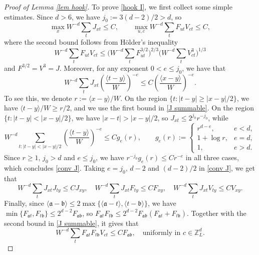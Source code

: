 \documentclass{article}
\newcommand{\1}{\mathds{1}}
\numberwithin{equation}{section}
\newcommand{\be}{\begin{equation}}
\newcommand{\ee}{\end{equation}}
\newcommand{\fa}{{\mathfrak a}}
\newcommand{\fb}{{\mathfrak b}}
\renewcommand{\leq}{\leqslant}
\renewcommand{\geq}{\geqslant}
\renewcommand{\le}{\leq}
\renewcommand{\ge}{\geq}
\newcommand{\Z}{\mathbb{Z}}
\theoremstyle{plain} %
\theoremstyle{remark}
\begin{document}
\begin{proof}[Proof of Lemma \ref{lem hook}]
To prove \eqref{hook I}, we first collect some simple estimates. Since $d>6$, we have $j_0:=3(d-2)/2>d$, so
\be\label{J summable}
\max_x W^{-d}\sum_t J_{xt}\le C,\qquad \max_{u,c}W^{-d}\sum_t F_{ut}V_{ct}\le C,
\ee
where the second bound follows from H\"older's inequality
$$W^{-d}\sum_tF_{ut}V_{ct}\le \Big(W^{-d}\sum_tF_{ut}^{3/2}\Big)^{2/3}\Big(W^{-d}\sum_tV_{ct}^3\Big)^{1/3}$$
and $F^{3/2}=V^3=J$. Moreover, for any exponent $0<e\le j_0$, we have that
\be\label{conv J}
W^{-d}\sum_t J_{xt}\left(\frac{\langle t-y\rangle}{W}\right)^{-e}\le C\left(\frac{\langle x-y\rangle}{W}\right)^{-e}.
\ee
To see this, we denote $r:=\langle x-y\rangle/W$. On the region $\{t:|t-y|\ge |x-y|/2\}$, we have $\langle t-y\rangle/W\ge r/2$, and we use the first bound in \eqref{J summable}. On the region $\{t:|t-y|<|x-y|/2\}$, we have $|x-t|>|x-y|/2$, so $J_{xt}\le 2^{j_0}r^{-j_0}$, while
$$W^{-d}\sum_{t:|t-y|<|x-y|/2}\left(\frac{\langle t-y\rangle}{W}\right)^{-e}\le C g_e(r),\qquad g_e(r):=\begin{cases}r^{d-e}, & e<d,\\ 1+\log r, & e=d,\\ 1, & e>d.\end{cases}$$
Since $r\ge 1$, $j_0>d$ and $e\le j_0$, we have $r^{-j_0}g_e(r)\le Cr^{-e}$ in all three cases, which concludes \eqref{conv J}. Taking $e=j_0$, $d-2$ and $(d-2)/2$ in \eqref{conv J}, we get that
\be\label{conv JFV}
W^{-d}\sum_t J_{xt}J_{ty}\le CJ_{xy},\quad W^{-d}\sum_t J_{xt}F_{ty}\le CF_{xy},\quad W^{-d}\sum_t J_{xt}V_{ty}\le CV_{xy}.
\ee
Finally, since $\langle \fa-\fb\rangle\le 2\max\{\langle \fa-t\rangle,\langle t-\fb\rangle\}$, we have $\min\{F_{\fa t},F_{t\fb}\}\le 2^{d-2}F_{\fa\fb}$, so $F_{\fa t}F_{t\fb}\le 2^{d-2}F_{\fa\fb}(F_{\fa t}+F_{t\fb})$. Together with the second bound in \eqref{J summable}, it gives that
\be\label{three point}
W^{-d}\sum_t F_{\fa t}F_{t\fb}V_{ct}\le CF_{\fa\fb},\quad \text{uniformly in }c\in \Z_L^d.
\ee


\end{proof}
\end{document}
